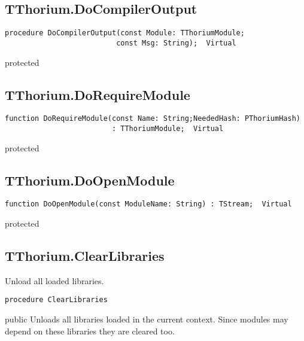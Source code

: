 \subsection{TThorium.DoCompilerOutput}
\label{thoriumcorepkg:thorium:tthorium:docompileroutput}
\begin{FPCList}
\Declaration 

\begin{verbatim}
procedure DoCompilerOutput(const Module: TThoriumModule;
                          const Msg: String);  Virtual
\end{verbatim}
\Visibility
protected
\end{FPCList}
\subsection{TThorium.DoRequireModule}
\label{thoriumcorepkg:thorium:tthorium:dorequiremodule}
\begin{FPCList}
\Declaration 

\begin{verbatim}
function DoRequireModule(const Name: String;NeededHash: PThoriumHash)
                         : TThoriumModule;  Virtual
\end{verbatim}
\Visibility
protected
\end{FPCList}
\subsection{TThorium.DoOpenModule}
\label{thoriumcorepkg:thorium:tthorium:doopenmodule}
\begin{FPCList}
\Declaration 

\begin{verbatim}
function DoOpenModule(const ModuleName: String) : TStream;  Virtual
\end{verbatim}
\Visibility
protected
\end{FPCList}
\subsection{TThorium.ClearLibraries}
\label{thoriumcorepkg:thorium:tthorium:clearlibraries}
\begin{FPCList}
\Synopsis
Unload all loaded libraries.\Declaration 

\begin{verbatim}
procedure ClearLibraries
\end{verbatim}
\Visibility
public
\Description
Unloads all libraries loaded in the current context. Since modules may depend on these libraries they are cleared too.\end{FPCList}
